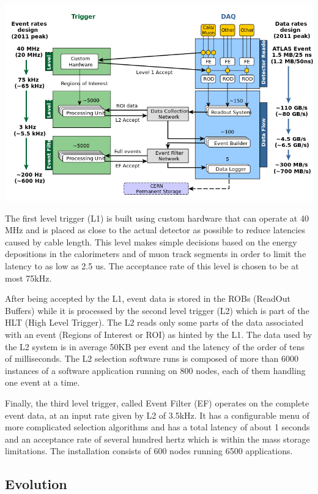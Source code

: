 \includegraphics[scale=0.5]{Images/Trigger.png}

The first level trigger (L1) is built using custom hardware that can operate at 40 MHz and is placed as close to the actual detector as possible to reduce latencies caused by cable length. This level makes simple decisions based on the energy depositions in the calorimeters and of muon track segments in order to limit the latency to as low as 2.5 us. The acceptance rate of this level is chosen to be at most 75kHz. 

After being accepted by the L1, event data is stored in the ROBs (ReadOut Buffers) while it is processed by the second level trigger (L2) which is part of the HLT (High Level Trigger). The L2 reads only some parts of the data associated with an event (Regions of Interest or ROI) as hinted by the L1. The data used by the L2 system is in average 50KB per event and the latency of the order of tens of milliseconds. The L2 selection software runs is composed of more than 6000 instances of a software application running on 800 nodes, each of them handling one event at a time. 

Finally, the third level trigger, called Event Filter (EF) operates on the complete event data, at an input rate given by L2 of 3.5kHz. It has a configurable menu of more complicated selection algorithms and has a total latency of about 1 seconds and an acceptance rate of several hundred hertz which is within the mass storage limitations. The installation consists of 600 nodes running 6500 applications.

\subsection*{Evolution}

